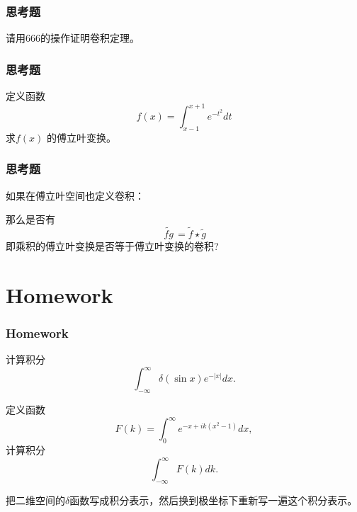 \documentclass[CJK]{beamer}
\begin{document}
\begin{frame}
  \frametitle{思考题}
  
  请用666的操作证明卷积定理。
  
\end{frame}


\begin{frame}
  \frametitle{思考题}

  定义函数
  $$ f(x) = \int_{x-1}^{x+1}e^{-t^2}dt $$
  求$f(x)$ 的傅立叶变换。
  
 \end{frame}



\begin{frame}
  \frametitle{思考题}

  如果在傅立叶空间也定义卷积：

  那么是否有
  $$\widetilde{\,fg\,} = \widetilde{f}\star \widetilde{g} $$
  即乘积的傅立叶变换是否等于傅立叶变换的卷积?
  
\end{frame}




\section{Homework}

\begin{frame}
  \frametitle{Homework}
  
  \bitem
\item{计算积分$$\int_{-\infty}^\infty \delta\left(\sin x\right) e^{-|x|} dx.$$ }
\item{定义函数
  $$ F(k) = \int_0^\infty e^{-x+ik(x^2-1)} dx, $$
  计算积分
  $$ \int_{-\infty}^\infty F(k) dk. $$}
\item{把二维空间的$\delta$函数写成积分表示，然后换到极坐标下重新写一遍这个积分表示。}  
  \eitem
  
\end{frame}



\ech
\end{document}
